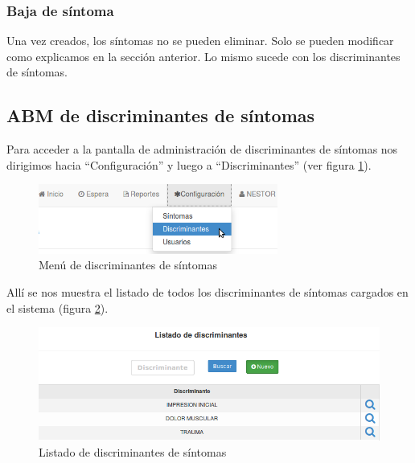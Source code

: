 \subsubsection{Baja de síntoma}
Una vez creados, los síntomas no se pueden eliminar. Solo se pueden modificar como explicamos en la sección anterior. Lo mismo sucede con los discriminantes de síntomas.

\subsection{ABM de discriminantes de síntomas}\label{ABM_discriminantes}
Para acceder a la pantalla de administración de discriminantes de síntomas nos dirigimos hacia ``Configuración'' y luego a ``Discriminantes'' (ver figura \ref{fig:menu_discriminantes}).
\begin{figure}
\centerline{\includegraphics[width=0.7\textwidth]{menu_discriminantes.png}}
\caption{Menú de discriminantes de síntomas}
\label{fig:menu_discriminantes}
\end{figure}
Allí se nos muestra el listado de todos los discriminantes de síntomas cargados en el sistema (figura \ref{fig:listado_discriminantes}).
\begin{figure}
\centerline{\includegraphics[width=1\textwidth]{listado_discriminantes.png}}
\caption{Listado de discriminantes de síntomas}
\label{fig:listado_discriminantes}
\end{figure}


